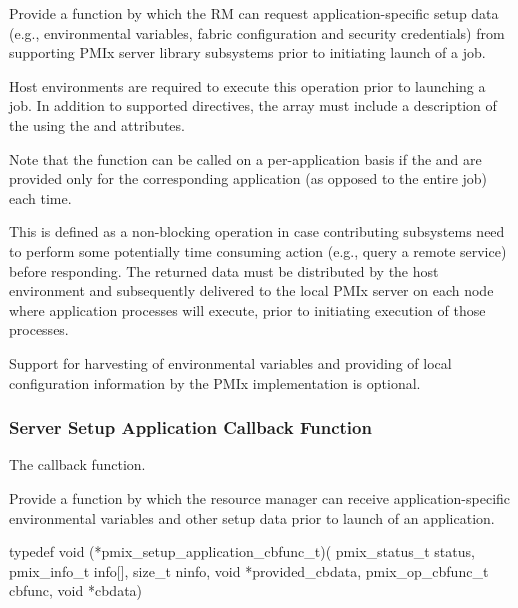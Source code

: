 Provide a function by which the \ac{RM} can request application-specific setup data (e.g., environmental variables, fabric configuration and security credentials) from supporting \ac{PMIx} server library subsystems prior to initiating launch of a job.

\advicermstart
Host environments are required to execute this operation prior to launching a job. In addition to supported directives, the  array must include a description of the  using the  and  attributes.

Note that the function can be called on a per-application basis if the  and  are provided only for the corresponding application (as opposed to the entire job) each time.
\advicermend

This is defined as a non-blocking operation in case contributing subsystems need to perform some potentially time consuming action (e.g., query a remote service) before responding. The returned data must be distributed by the host environment and subsequently delivered to the local \ac{PMIx} server on each node where application processes will execute, prior to initiating execution of those processes.

\adviceimplstart
Support for harvesting of environmental variables and providing of local configuration information by the \ac{PMIx} implementation is optional.
\adviceimplend

\subsubsection{Server Setup Application Callback Function}

The  callback function.

\summary

Provide a function by which the resource manager can receive application-specific environmental variables and other setup data prior to launch of an application.

\format

\cspecificstart
\begin{codepar}
typedef void (*pmix_setup_application_cbfunc_t)(
                        pmix_status_t status,
                        pmix_info_t info[], size_t ninfo,
                        void *provided_cbdata,
                        pmix_op_cbfunc_t cbfunc, void *cbdata)
\end{codepar}
\cspecificend

